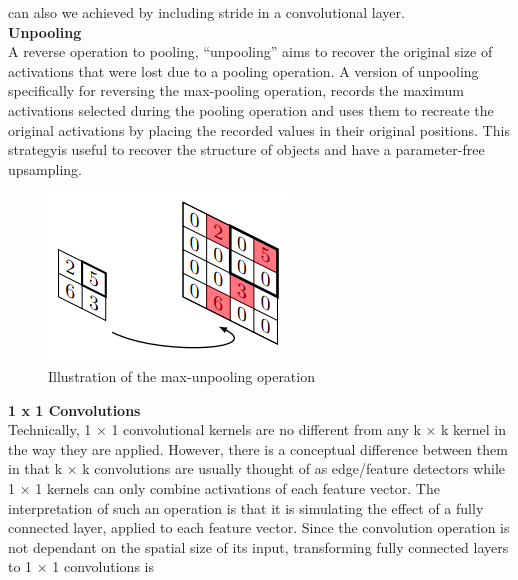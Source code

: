 \begin{enumerate}
                    can also we achieved by including stride in a convolutional layer. \\ 
                    \vspace{3mm}
                    \textbf{Unpooling} \\ 
                    \vspace{3mm}
                    A reverse operation to pooling, “unpooling” aims to recover the original size of activations that were lost due to a pooling operation. A version of unpooling specifically
                    for reversing the max-pooling operation, records the maximum activations selected
                    during the pooling operation and uses them to recreate the original activations by
                    placing the recorded values in their original positions. This strategyis useful to recover the structure of objects and have a parameter-free
                    upsampling. 
                    \begin{figure}[H]
                        \centering
                        \includegraphics[width=0.4\linewidth]{img/max-unpooling.png}
                        \caption{Illustration of the max-unpooling operation}
                    \end{figure}
                    \textbf{1 x 1 Convolutions} \\ 
                    \vspace{3mm}
                    Technically, 1 × 1 convolutional kernels are no different from any k × k kernel in the
                    way they are applied. However, there is a conceptual difference between them in
                    that k × k convolutions are usually thought of as edge/feature detectors while 1 × 1
                    kernels can only combine activations of each feature vector. The interpretation of
                    such an operation is that it is simulating the effect of a fully connected layer, applied
                    to each feature vector. Since the convolution operation is not dependant on the
                    spatial size of its input, transforming fully connected layers to 1 × 1 convolutions is

\end{enumerate}

